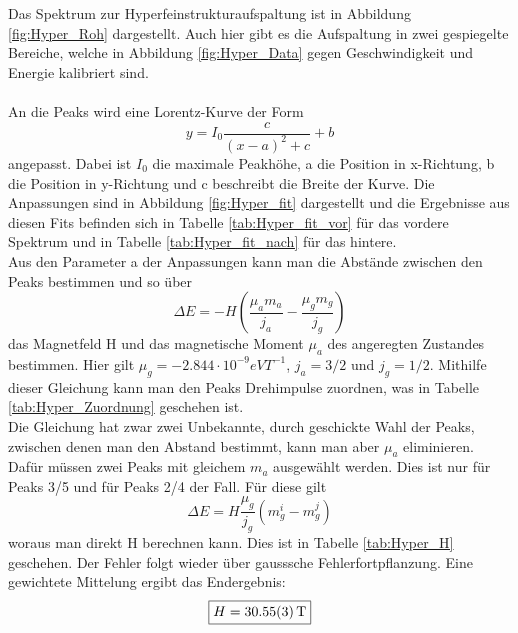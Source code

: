 \documentclass[12pt,a4paper]{article}
\begin{document}
Das Spektrum zur Hyperfeinstrukturaufspaltung ist in Abbildung \ref{fig:Hyper_Roh} dargestellt. Auch hier gibt es die Aufspaltung in zwei gespiegelte Bereiche, welche in Abbildung \ref{fig:Hyper_Data} gegen Geschwindigkeit und Energie kalibriert sind.\\
\\
An die Peaks wird eine Lorentz-Kurve der Form
\begin{equation*}
y = I_0 \dfrac{c}{(x-a)^2+c}+b
\end{equation*}
angepasst. Dabei ist $I_0$ die maximale Peakhöhe, a die Position in x-Richtung, b die Position in y-Richtung und c beschreibt die Breite der Kurve.
Die Anpassungen sind in Abbildung \ref{fig:Hyper_fit} dargestellt und die Ergebnisse aus diesen Fits befinden sich in Tabelle \ref{tab:Hyper_fit_vor} für das vordere Spektrum und in Tabelle \ref{tab:Hyper_fit_nach} für das hintere.
\\
Aus den Parameter a der Anpassungen kann man die Abstände zwischen den Peaks bestimmen und so über 
\begin{equation}
\Delta E = -H\left(\dfrac{\mu_a m_a}{j_a}-\dfrac{\mu_g m_g}{j_g}\right)
\label{eq:Hyper}
\end{equation}
das Magnetfeld H und das magnetische Moment $\mu_a$ des angeregten Zustandes bestimmen. Hier gilt $\mu_g = -2.844\cdot 10^{-9}eVT^{-1}$, $j_a = 3/2$ und $j_g = 1/2$.  Mithilfe dieser Gleichung kann man den Peaks Drehimpulse zuordnen, was in Tabelle \ref{tab:Hyper_Zuordnung} geschehen ist.\\
Die Gleichung hat zwar zwei Unbekannte, durch geschickte Wahl der Peaks, zwischen denen man den Abstand bestimmt, kann man aber $\mu_a$ eliminieren. Dafür müssen zwei Peaks mit gleichem $m_a$ ausgewählt werden. Dies ist nur für Peaks 3/5 und für Peaks 2/4 der Fall. Für diese gilt
\begin{equation*}
\Delta E = H\dfrac{\mu_g}{j_g}(m_{g}^i-m_{g}^j)
\end{equation*}
woraus man direkt H berechnen kann. Dies ist in Tabelle \ref{tab:Hyper_H} geschehen. Der Fehler folgt wieder über gausssche Fehlerfortpflanzung. Eine gewichtete Mittelung ergibt das Endergebnis:
\begin{equation*}
\boxed{H = \SI{30.55\pm 0.03}{T}}
\end{equation*}
\end{document}

